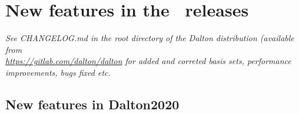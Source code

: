 \chapter{New features in the \dalton\ releases}


{\it See {\rm CHANGELOG.md} in the root directory of the Dalton distribution (available from \\ {\rm \url{https://gitlab.com/dalton/dalton}} for 
added and correted basis sets, performance improvements, bugs fixed etc. }

\section{New features in Dalton2020}

